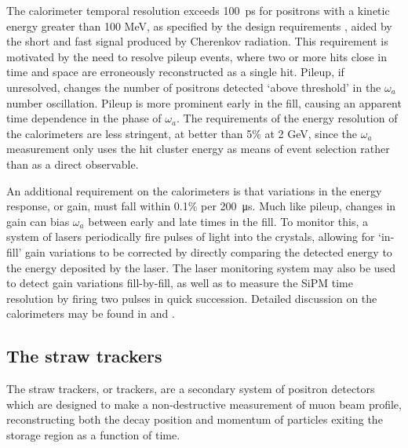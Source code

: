 The calorimeter temporal resolution exceeds \SI{100}{\pico\second} for positrons with a kinetic energy greater than 100 MeV, as specified by the design requirements \cite{TDR}, aided by the short and fast signal produced by Cherenkov radiation. This requirement is motivated by the need to resolve pileup events, where two or more hits close in time and space are erroneously reconstructed as a single hit. Pileup, if unresolved, changes the number of positrons detected `above threshold' in the $\omega_{a}$ number oscillation. Pileup is more prominent early in the fill, causing an apparent time dependence in the phase of $\omega_{a}$. The requirements of the energy resolution of the calorimeters are less stringent, at better than 5\% at 2 GeV, since the $\omega_{a}$ measurement only uses the hit cluster energy as means of event selection rather than as a direct observable. 

An additional requirement on the calorimeters is that variations in the energy response, or gain, must fall within 0.1\% per \SI{200}{\micro\second}. Much like pileup, changes in gain can bias $\omega_{a}$ between early and late times in the fill. To monitor this, a system of lasers periodically fire pulses of light into the crystals, allowing for `in-fill' gain variations to be corrected by directly comparing the detected energy to the energy deposited by the laser. The laser monitoring system may also be used to detect gain variations fill-by-fill, as well as to measure the SiPM time resolution by firing two pulses in quick succession. Detailed discussion on the calorimeters may be found in \cite{TDR} and \cite{Hempstead}.

\subsection{The straw trackers}\label{subsec:Trackers}

The straw trackers, or trackers, are a secondary system of positron detectors which are designed to make a non-destructive measurement of muon beam profile, reconstructing both the decay position and momentum of particles exiting the storage region as a function of time.

